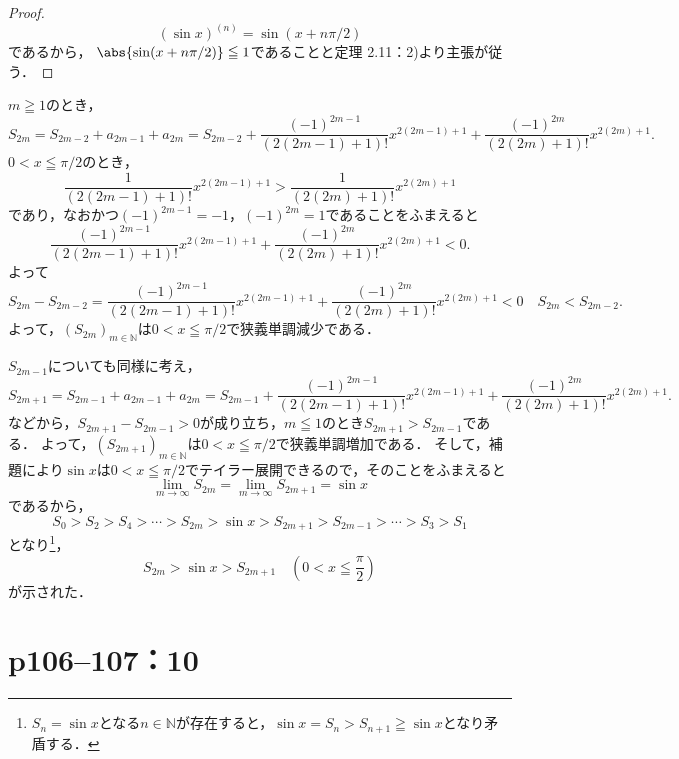 \begin{proof}
    \[
        (\sin x)^{(n)} =\sin(x + n\pi/2)
    \]
    であるから， $ \abs{\sin (x+n\pi/2)}  \leqq 1$であることと定理 2.11：2)より主張が従う．
\end{proof}

\begin{tproof}
    $m \geqq 1$のとき，
    \[
        S_{2m} = S_{2m-2} +a_{2m-1} + a_{2m} = S_{2m-2} + \frac{(-1)^{2m-1}}{(2(2m-1)+1)!} x^{2(2m-1)+1} + \frac{(-1)^{2m}}{(2(2m)+1)!} x^{2(2m)+1}.
    \]
    $ 0< x \leqq \pi /2$のとき，
    \[
        \frac{1}{(2(2m-1)+1)!} x^{2(2m-1)+1} > \frac{1}{(2(2m)+1)!} x^{2(2m)+1}
    \]
    であり，なおかつ$(-1)^{2m-1} =-1$，$(-1)^{2m} =1$であることをふまえると
    \[
        \frac{(-1)^{2m-1}}{(2(2m-1)+1)!} x^{2(2m-1)+1} + \frac{(-1)^{2m}}{(2(2m)+1)!} x^{2(2m)+1} <0.
    \]
    よって
    \[
        S_{2m} -S_{2m-2}  = \frac{(-1)^{2m-1}}{(2(2m-1)+1)!} x^{2(2m-1)+1} + \frac{(-1)^{2m}}{(2(2m)+1)!} x^{2(2m)+1} <0 \quad S_{2m}<S_{2m-2}.
    \]
    よって，$(S_{2m})_{m \in \mathbb{N}}$は$0 < x \leqq \pi /2$で狭義単調減少である．

    $S_{2m-1}$についても同様に考え，
    \[
        S_{2m+1}=S_{2m-1} + a_{2m-1} +a_{2m}= S_{2m-1} + \frac{(-1)^{2m-1}}{(2(2m-1)+1)!} x^{2(2m-1)+1} + \frac{(-1)^{2m}}{(2(2m)+1)!} x^{2(2m)+1}.
    \]
    などから，$ S_{2m+1}-S_{2m-1} >0$が成り立ち，$m \leqq 1$のとき$S_{2m+1}>S_{2m-1}$である．
    よって，$(S_{2m+1})_{m \in \mathbb{N}}$は$0 < x \leqq \pi /2$で狭義単調増加である．
    そして，補題により$\sin x $は$0 < x \leqq \pi /2$でテイラー展開できるので，そのことをふまえると
    \[
        \lim_{m \to \infty} S_{2m} =\lim_{m \to \infty} S_{2m+1} =\sin x
    \]
    であるから，
    \[
        S_0 > S_2 > S_4 > \cdots > S_{2m} > \sin x > S_{2m+1} > S_{2m-1} > \cdots > S_3 > S_1
    \]
    となり\footnote{$S_n=\sin x$となる$n \in \mathbb{N}$が存在すると，$ \sin x=S_n  > S_{n+1}\geqq \sin x$となり矛盾する．}，
    \[
        S_{2m} > \sin x > S_{2m+1} \quad ( 0 < x \leqq \frac{\pi}{2} )
    \]
    が示された．
\end{tproof}


\section*{p106--107：10}



